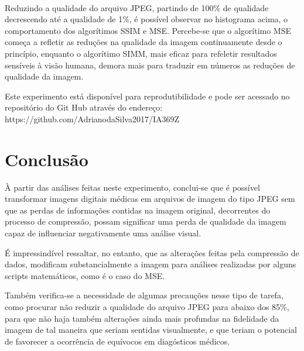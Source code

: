 \documentclass{IEEEtran}
\begin{document}
    \begin{center}
    \end{center}
    { \hspace*{\fill} \\}
    
    Reduzindo a qualidade do arquivo JPEG, partindo de 100\% de qualidade
decrescendo até a qualidade de 1\%, é possível observar no histograma
acima, o comportamento dos algorítimos SSIM e MSE. Percebe-se que o
algorítimo MSE começa a refletir as reduções na qualidade da imagem
continuamente desde o princípio, enquanto o algorítimo SIMM, mais eficaz
para refeletir resultados sensíveis à visão humana, demora mais para
traduzir em números as reduções de qualidade da imagem.

    Este experimento está disponível para reprodutibilidade e pode ser
acessado no repositório do Git Hub através do endereço:
https://github.com/AdrianodaSilva2017/IA369Z 

    \section{Conclusão}\label{conclusuxe3o}

    À partir das análises feitas neste experimento, conclui-se que é
possível transformar imagens digitais médicas em arquivos de imagem do
tipo JPEG sem que as perdas de informações contidas na imagem original,
decorrentes do processo de compressão, possam significar uma perda de
qualidade da imagem capaz de influenciar negativamente uma análise
visual.

É impressindível ressaltar, no entanto, que as alterações feitas pela
compressão de dados, modificam substancialmente a imagem para análises
realizadas por alguns scripts matemáticos, como é o caso do MSE.

Também verifica-se a necessidade de algumas precauções nesse tipo de
tarefa, como procurar não reduzir a qualidade do arquivo JPEG para
abaixo dos 85\%, para que não haja também alterações ainda mais
profundas na fidelidade da imagem de tal maneira que seriam sentidas
visualmente, e que teriam o potencial de favorecer a ocorrência de
equívocos em diagósticos médicos. 

    


    
    



    
    
\end{document}
